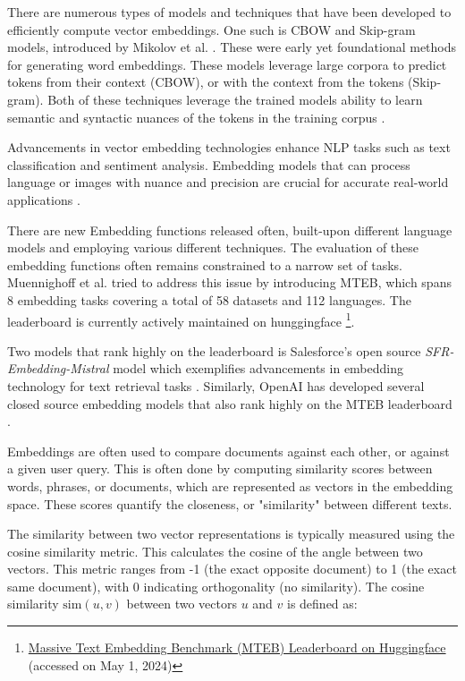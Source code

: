 


There are numerous types of models and techniques that have been developed to efficiently compute vector embeddings. One such is \gls{CBOW} and Skip-gram models, introduced by Mikolov et al. \cite{mikolov_efficient_2013}. These were early yet foundational methods for generating word embeddings. These models leverage large corpora to predict tokens from their context (CBOW), or with the context from the tokens (Skip-gram). Both of these techniques leverage the trained models ability to learn semantic and syntactic nuances of the tokens in the training corpus \cite{mikolov_efficient_2013, mikolov_distributed_2013}.


Advancements in vector embedding technologies enhance \gls{NLP} tasks such as text classification and sentiment analysis. Embedding models that can process language or images with nuance and precision are crucial for accurate real-world applications \cite{pennington_glove_2014}.


There are new Embedding functions released often, built-upon different language models and employing various different techniques. The evaluation of these embedding functions often remains constrained to a narrow set of tasks. Muennighoff et al. \cite{muennighoff_mteb_2023} tried to address this issue by introducing \gls{MTEB}, which spans 8 embedding tasks covering a total of 58 datasets and 112 languages. The leaderboard is currently actively maintained on hunggingface \footnote{\href{https://huggingface.co/spaces/mteb/leaderboard}{Massive Text Embedding Benchmark (MTEB) Leaderboard on Huggingface} (accessed on May 1, 2024)}.


Two models that rank highly on the leaderboard is Salesforce's open source \textit{SFR-Embedding-Mistral} model which exemplifies advancements in embedding technology for text retrieval tasks \cite{meng_sfr-embedding-mistral_2024}. Similarly, OpenAI has developed several closed source embedding models that also rank highly on the MTEB leaderboard \cite{openai_new_2022, openai_new_2024}.


Embeddings are often used to compare documents against each other, or against a given user query. This is often done by computing similarity scores between words, phrases, or documents, which are represented as vectors in the embedding space. These scores quantify the closeness, or "similarity" between different texts.


The similarity between two vector representations is typically measured using the cosine similarity metric. This calculates the cosine of the angle between two vectors. This metric ranges from -1 (the exact opposite document) to 1 (the exact same document), with 0 indicating orthogonality (no similarity). The cosine similarity \( \text{sim}(u, v) \) between two vectors \( u \) and \( v \) is defined as:


